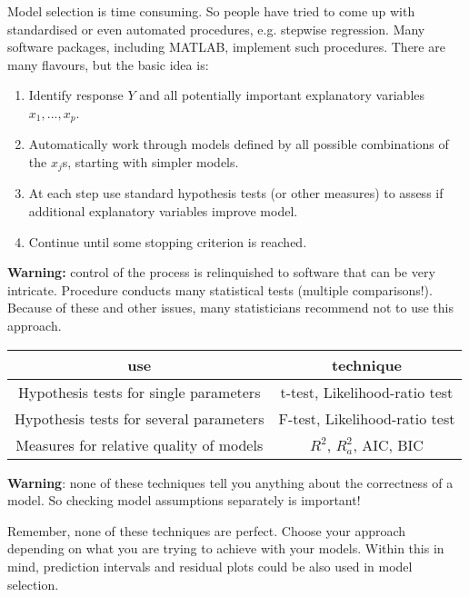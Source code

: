 Model selection is time consuming. So people have tried to come up with standardised or even automated procedures, e.g. stepwise regression. Many software packages, including MATLAB, implement such procedures. There are many flavours, but the basic idea is:
\begin{enumerate}[label=\textbf{\arabic*.}]
	\item Identify response $Y$ and all potentially important explanatory variables $x_1,...,x_p$.
	\item Automatically work through models defined by all possible combinations of the $x_j$s, starting with simpler models.
	\item At each step use standard hypothesis tests (or other measures) to assess if additional explanatory variables improve model.
	\item Continue until some stopping criterion is reached.
\end{enumerate}

\textbf{Warning:} control of the process is relinquished to software that can be very intricate. Procedure conducts many statistical tests (multiple comparisons!). Because of these and other issues, many statisticians recommend not to use this approach.

\begin{center}
	\begin{tabular}{c|c}
		\textbf{use} & \textbf{technique} \\
		\hline
		Hypothesis tests for single parameters & t-test, Likelihood-ratio test \\
		Hypothesis tests for several parameters & F-test, Likelihood-ratio test \\
		Measures for relative quality of models & $R^2$, $R^2_a$, AIC, BIC
	\end{tabular}
\end{center}

\textbf{Warning}: none of these techniques tell you anything about the correctness of a model. So checking model assumptions separately is important!

Remember, none of these techniques are perfect. Choose your approach depending on what you are trying to achieve with your models. Within this in mind, prediction intervals and residual plots could be also used in model selection.